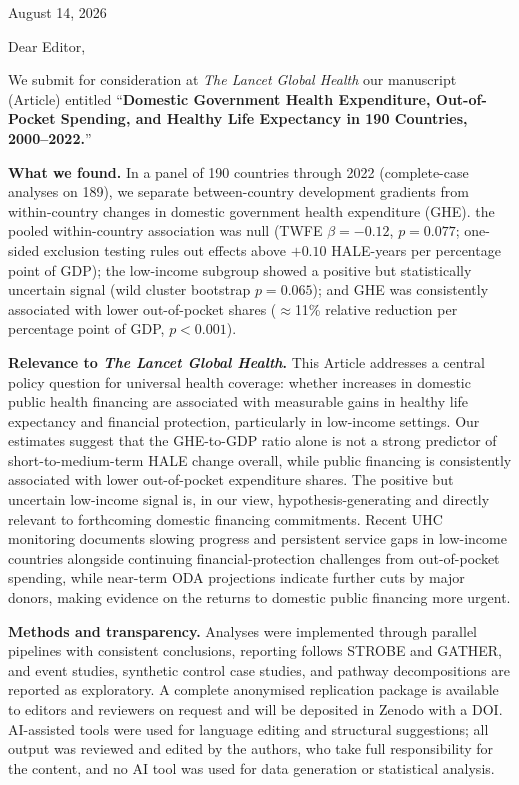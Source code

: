 \documentclass[11pt,a4paper]{article}
\begin{document}
\begin{flushright}
August 14, 2026
\end{flushright}

\vspace{12pt}

\noindent Dear Editor,

\vspace{12pt}

We submit for consideration at \textit{The Lancet Global Health} our
manuscript (Article) entitled ``\textbf{Domestic Government Health Expenditure, Out-of-Pocket Spending, and
Healthy Life Expectancy in 190 Countries, 2000--2022.}''

\textbf{What we found.} In a panel of 190 countries through 2022 (complete-case analyses on 189), we
separate between-country development gradients from within-country changes
in domestic government health expenditure (GHE). the pooled within-country association was null (TWFE
$\beta = -0.12$, $p = 0.077$; one-sided exclusion testing rules out
effects above $+0.10$ HALE-years per percentage point of GDP); the
low-income subgroup showed a positive but statistically uncertain signal
(wild cluster bootstrap $p = 0.065$); and GHE was consistently associated
with lower out-of-pocket shares ($\approx$11\% relative reduction per
percentage point of GDP, $p < 0.001$).

\textbf{Relevance to \textit{The Lancet Global Health}.} This Article
addresses a central policy question for universal health coverage: whether
increases in domestic public health financing are associated with
measurable gains in healthy life expectancy and financial protection,
particularly in low-income settings. Our estimates suggest that the
GHE-to-GDP ratio alone is not a strong predictor of short-to-medium-term
HALE change overall, while public financing is consistently associated with
lower out-of-pocket expenditure shares. The positive but uncertain
low-income signal is, in our view, hypothesis-generating and directly
relevant to forthcoming domestic financing commitments. Recent UHC monitoring documents slowing progress and persistent service gaps in low-income countries alongside continuing
financial-protection challenges from out-of-pocket spending, while
near-term ODA projections indicate further cuts by major donors, making evidence on the returns to domestic public financing more urgent.

\textbf{Methods and transparency.} Analyses were implemented through
parallel pipelines with consistent conclusions, reporting follows STROBE
and GATHER, and event studies, synthetic control case studies, and pathway
decompositions are reported as exploratory. A complete anonymised
replication package is available to editors and reviewers on request and
will be deposited in Zenodo with a DOI. AI-assisted tools were used for
language editing and structural suggestions; all output was reviewed and
edited by the authors, who take full responsibility for the content, and
no AI tool was used for data generation or statistical analysis.
\end{document}
